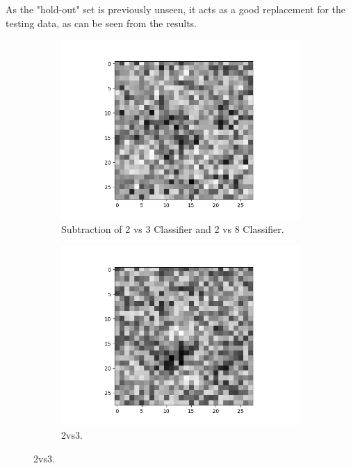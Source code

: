 \documentclass{article} %
\begin{document}
As the "hold-out" set is previously unseen, it acts as a good replacement for the testing data, as can be seen from the results.
\begin{figure}[H]
\centering
\begin{subfigure}{.5\textwidth}	
	\centering
	\includegraphics[width=1.05\linewidth]{2vs3-2vs8.png}
	\caption{Subtraction of 2 vs 3 Classifier and 2 vs 8 Classifier.}
\end{subfigure}%
\begin{subfigure}{.5\textwidth}
	\centering
	\includegraphics[width=1.05\linewidth]{2vs3.png}
	\caption{2vs3.}
   \end{subfigure}
\end{figure}
\end{document}
